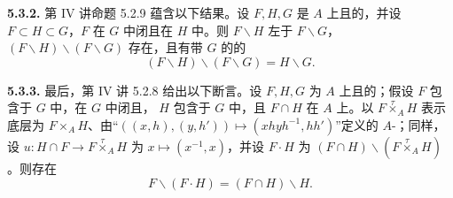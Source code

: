\textbf{5.3.2.} 第 IV 讲命题 5.2.9 蕴含以下结果。设 $F,H,G$ 是 $A$ 上且的，并设 $F\subset H\subset G$，$F$ 在 $G$ 中闭且在 $H$ 中。则 $F\backslash H$ 左于 $F\backslash G$， $(F\backslash H)\backslash(F\backslash G)$ 存在，且有带 $G$ 的的
\[
(F\backslash H)\backslash(F\backslash G)=H\backslash G.
\]

\textbf{5.3.3.} 最后，第 IV 讲 5.2.8 给出以下断言。设 $F,H,G$ 为 $A$ 上且的；假设 $F$ 包含于 $G$ 中，在 $G$ 中闭且，
$H$ 包含于 $G$ 中，且 $F\cap H$ 在 $A$ 上。以 $F\mathbin{\overset{\tau}{\times}}_A H$ 表示底层为 $F\times_A H$、由“$((x,h),(y,h'))\mapsto(xhyh^{-1},hh')$”定义的 $A$-；同样，设 $u:H\cap F\to F\mathbin{\overset{\tau}{\times}}_A H$ 为 $x\mapsto(x^{-1},x)$，并设 $F\cdot H$ 为 $(F\cap H)\backslash(F\mathbin{\overset{\tau}{\times}}_A H)$。则存在
\[
F\backslash(F\cdot H)=(F\cap H)\backslash H.
\]


